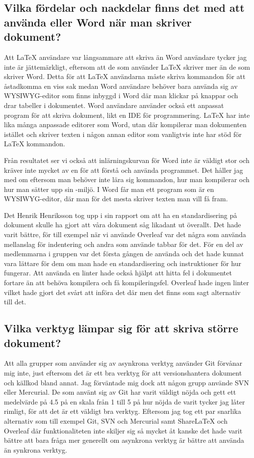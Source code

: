 \subsection{Vilka fördelar och nackdelar finns det med att använda \latex eller Word när man skriver dokument?}
Att LaTeX användare var långsammare att skriva än Word användare tycker jag inte är jättemärkligt, eftersom att de som använder LaTeX skriver mer än de som skriver Word. Detta för att LaTeX användarna måste skriva kommandon för att åstadkomma en viss sak medan Word användare behöver bara använda sig av WYSIWYG-editor som finns inbyggd i Word där man klickar på knappar och drar tabeller i dokumentet. Word användare använder också ett anpassat program för att skriva dokument, likt en IDE för programmering. LaTeX har inte lika många anpassade editorer som Word, utan där kompilerar man dokumenten istället och skriver texten i någon annan editor som vanligtvis inte har stöd för LaTeX kommandon.

Från resultatet ser vi också att inlärningskurvan för Word inte är väldigt stor och kräver inte mycket av en för att förstå och använda programmet. Det håller jag med om eftersom man behöver inte lära sig kommandon, hur man kompilerar och hur man sätter upp sin \latex-miljö. I Word får man ett program som är en WYSIWYG-editor, där man för det mesta skriver texten man vill få fram.

Det Henrik Henriksson tog upp i sin rapport om att ha en standardisering på \latex dokument skulle ha gjort att våra dokument såg likadant ut överallt. Det hade varit bättre, för till exempel när vi använde Overleaf var det några som använda mellanslag för indentering och andra som använde tabbar för det. För en del av medlemmarna i gruppen var det första gången de använda \latex och det hade kunnat vara lättare för dem om man hade en standardisering och instruktioner för hur \latex fungerar. Att använda en linter hade också hjälpt att hitta fel i dokumentet fortare än att behöva kompilera och få kompileringsfel. Overleaf hade ingen linter vilket hade gjort det svårt att införa det där men det finns som sagt alternativ till det.

\subsection{Vilka verktyg lämpar sig för att skriva större dokument?}
Att alla grupper som använder sig av asynkrona verktyg använder Git förvånar mig inte, just eftersom det är ett bra verktyg för att versionshantera dokument och källkod bland annat. Jag förväntade mig dock att någon grupp använde SVN eller Mercurial. De som använt sig av Git har varit väldigt nöjda och gett ett medelvärde på 4.5 på en skala från 1 till 5 på hur nöjda de varit tycker jag låter rimligt, för att det är ett väldigt bra verktyg. Eftersom jag tog ett par snarlika alternativ som till exempel Git, SVN och Mercurial samt ShareLaTeX och Overleaf där funktionaliteten inte skiljer sig så mycket åt kanske det hade varit bättre att bara fråga mer generellt om asynkrona verktyg är bättre att använda än synkrona verktyg.

